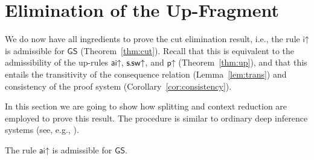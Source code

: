 \documentclass{lmcs} %
\def\GS{\mathsf{GS}}
\def\iur{\uirule}
\def\aiur{\uairule}
\def\ssur{\ussrule}
\def\pur{\uprule}
\def\airule{\mathsf{ai}}
\def\uairule{\airule\mathord{\uparrow}}
\def\irule{\mathsf{i}}
\def\uirule{\irule\mathord{\uparrow}}
\def\ssrule{\mathsf{s\mkern-1mu.\mkern-1mu sw}}
\def\ussrule{\ssrule\mathord{\uparrow}}
\def\prule{\mathsf{p}}
\def\uprule{\prule\mathord{\uparrow}}
\theoremstyle{plain}
\begin{document}
\section{Elimination of the Up-Fragment}\label{sec:upfrag}

We do now have all ingredients to prove the cut elimination result, i.e., the rule $\iur$ is admissible for $\GS$ (Theorem~\ref{thm:cut}). Recall that this is equivalent to the admissibility of the up-rules $\aiur$, $\ssur$, and $\pur$ (Theorem~\ref{thm:up}), and that this entails the transitivity of the consequence relation (Lemma~\ref{lem:trans}) and consistency of the proof system (Corollary~\ref{cor:consistency}).

In this section we are going to show how  splitting and context reduction
are employed to prove this result.
The procedure is similar to ordinary deep inference systems (see, e.g.,
\cite{dissvonlutz,SIS-V,ross:MAV1,CGS:foccos}). 

\begin{thm}\label{thm:ai-up}
  The rule $\aiur$ is admissible for $\GS$.
\end{thm}
\end{document}
